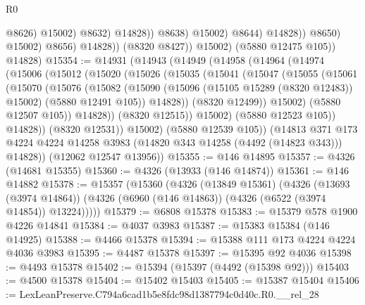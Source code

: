 \begin{lexlean}{R0}
\begin{coremodule}
                                          @8626)
                                        @15002)
                                      @8632)
                                    @14828))
                                @8638)
                              @15002)
                            @8644)
                          @14828))
                      @8650)
                    @15002)
                  @8656)
                @14828))
            (@8320 @8427))
          @15002)
        (@5880 @12475 @105))
      @14828)
@15354 := @14931
    (@14943
      (@14949
        (@14958
          (@14964
            (@14974
              (@15006
                (@15012
                  (@15020
                    (@15026
                      (@15035
                        (@15041
                          (@15047
                            (@15055
                              (@15061
                                (@15070
                                  (@15076
                                    (@15082
                                      (@15090
                                        (@15096 (@15105 @15289 (@8320 @12483)) @15002)
                                        (@5880 @12491 @105))
                                      @14828))
                                  (@8320 @12499))
                                @15002)
                              (@5880 @12507 @105))
                            @14828))
                        (@8320 @12515))
                      @15002)
                    (@5880 @12523 @105))
                  @14828))
              (@8320 @12531))
            @15002)
          (@5880 @12539 @105))
        (@14813
          @371
          @173
          @4224
          @4224
          @14258
          @3983
          (@14820 @343 @14258 (@4492 (@14823 @343)))
          @14828))
      (@12062 @12547 @13956))
@15355 := @146 @14895
@15357 := @4326 (@14681 @15355)
@15360 := @4326 (@13933 (@146 @14874))
@15361 := @146 @14882
@15378 := @15357
    (@15360
      (@4326
        (@13849 @15361)
        (@4326
          (@13693 (@3974 @14864))
          (@4326 (@6960 (@146 @14863)) (@4326 (@6522 (@3974 @14854)) @13224)))))
@15379 := @6808 @15378
@15383 := @15379 @578 @1900 @4226 @14841
@15384 := @4037 @3983
@15387 := @15383 @15384 (@146 @14925)
@15388 := @4466 @15378
@15394 := @15388 @111 @173 @4224 @4224 @4036 @3983
@15395 := @4487 @15378
@15397 := @15395 @92 @4036
@15398 := @4493 @15378
@15402 := @15394 (@15397 (@4492 (@15398 @92)))
@15403 := @4500 @15378
@15404 := @15402 @15403
@15405 := @15387 @15404
@15406 := LexLeanPreserve.C794a6cad1b5e8fdc98d1387794c0d40c.R0.__rel_28

\end{coremodule}
\end{lexlean}
